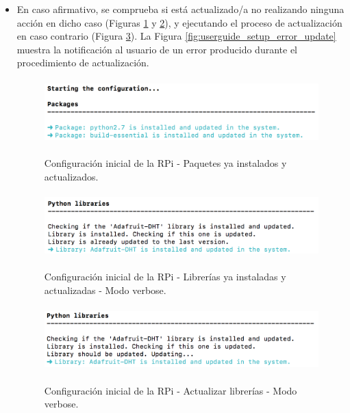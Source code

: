 \documentclass[12pt,a4paper, twoside]{report}
\begin{document}
	\begin{itemize}
		\item En caso afirmativo, se comprueba si está actualizado/a no realizando ninguna acción en dicho caso (Figuras \ref{fig:userguide_setup_packages_updated} y \ref{fig:userguide_setup_libraries_updated}), y ejecutando el proceso de actualización en caso contrario (Figura \ref{fig:userguide_setup_update_library}). La Figura \ref{fig:userguide_setup_error_update} muestra la notificación al usuario de un error producido durante el procedimiento de actualización.
		
		\begin{figure}[!ht]   
			\caption{Configuración inicial de la RPi - Paquetes ya instalados y actualizados.} 
			\begin{center} 
				\includegraphics[width=12cm,height=2.5cm]{Images/userGuide/setup/packages_updated} \\
				\label{fig:userguide_setup_packages_updated} 
			\end{center}  
		\end{figure}
			
		\begin{figure}[!ht]   
			\caption{Configuración inicial de la RPi - Librerías ya instaladas y actualizadas - Modo verbose.} 
			\begin{center} 
				\includegraphics[width=14cm,height=2.5cm]{Images/userGuide/setup/libraries_updated} \\
				\label{fig:userguide_setup_libraries_updated} 
			\end{center}  
		\end{figure}
		
		\begin{figure}[!ht]   
			\caption{Configuración inicial de la RPi - Actualizar librerías - Modo verbose.} 
			\begin{center} 
				\includegraphics[width=14cm,height=2.5cm]{Images/userGuide/setup/update_library} \\
				\label{fig:userguide_setup_update_library} 
			\end{center}  
		\end{figure}
		

\end{itemize}
\end{document}

